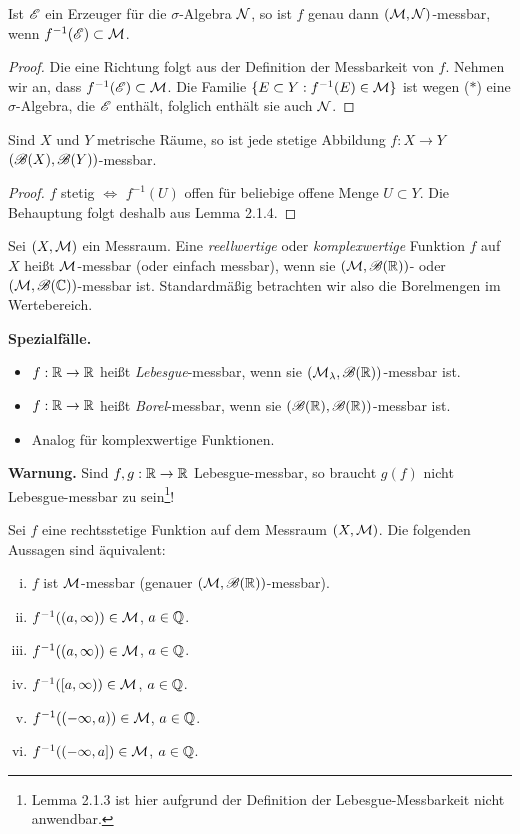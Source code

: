 \clearpage

\begin{lem}
 Ist $\mathscr{E}$ ein Erzeuger für die $\sigma$-Algebra $\mathcal{N}$, so ist $f$ genau dann $(\mathcal{M},\mathcal{N})$-messbar, wenn $f^{-1}(\mathscr{E}) \subset \mathcal{M}$.
\end{lem}

\begin{proof}
 Die eine Richtung folgt aus der Definition der Messbarkeit von $f$. Nehmen wir an, dass $f^{-1}(\mathscr{E}) \subset \mathcal{M}$. Die Familie $\{ E \subset Y : f^{-1}(E) \in \mathcal{M} \}$ ist wegen ($\ast$) eine $\sigma$-Algebra, die $\mathscr{E}$ enthält, folglich enthält sie auch $\mathcal{N}$.
\end{proof}

\begin{folg}
 Sind $X$ und $Y$ metrische Räume, so ist jede stetige Abbildung $f: X \to Y$ $(\mathscr{B}(X),\mathscr{B}(Y))$-messbar.
\end{folg}

\begin{proof}
 $f$ stetig $\Leftrightarrow$ $f^{-1}(U)$ offen für beliebige offene Menge $U \subset Y$. Die Behauptung folgt deshalb aus Lemma 2.1.4.
\end{proof}

Sei $(X,\mathcal{M})$ ein Messraum. Eine \emph{reellwertige} oder \emph{komplexwertige} Funktion $f$ auf $X$ heißt $\mathcal{M}$-messbar (oder einfach messbar), wenn sie $(\mathcal{M},\mathscr{B}(\mathbb{R}))$- oder $(\mathcal{M},\mathscr{B}(\mathbb{C}))$-messbar ist. Standardmäßig betrachten wir also die Borelmengen im Wertebereich.

\textbf{Spezialfälle.}
\begin{itemize}
 \item $f: \mathbb{R} \to \mathbb{R}$ heißt \emph{Lebesgue}-messbar, wenn sie $(\mathcal{M}_\lambda, \mathscr{B}(\mathbb{R}))$-messbar ist.
 \item $f: \mathbb{R} \to \mathbb{R}$ heißt \emph{Borel}-messbar, wenn sie $(\mathscr{B}(\mathbb{R}), \mathscr{B}(\mathbb{R}))$-messbar ist.
 \item Analog für komplexwertige Funktionen.
\end{itemize}

\textbf{Warnung.}
Sind $f,g: \mathbb{R} \to \mathbb{R}$ Lebesgue-messbar, so braucht $g(f)$ nicht Lebesgue-messbar zu sein\footnote{Lemma 2.1.3 ist hier aufgrund der Definition der Lebesgue-Messbarkeit nicht anwendbar.}!

\begin{lem}
 Sei $f$ eine rechtsstetige Funktion auf dem Messraum $(X,\mathcal{M})$. Die folgenden Aussagen sind äquivalent:
 \begin{enumerate}[(i)]
  \item $f$ ist $\mathcal{M}$-messbar (genauer $(\mathcal{M},\mathscr{B}(\mathbb{R}))$-messbar).
  \item $f^{-1}((a,\infty)) \in \mathcal{M}$, $a \in \mathbb{Q}$.
  \item $f^{-1}((a,\infty)) \in \mathcal{M}$, $a \in \mathbb{Q}$.
  \item $f^{-1}([a,\infty)) \in \mathcal{M}$, $a \in \mathbb{Q}$.
  \item $f^{-1}((-\infty,a)) \in \mathcal{M}$, $a \in \mathbb{Q}$.
  \item $f^{-1}((-\infty,a]) \in \mathcal{M}$, $a \in \mathbb{Q}$.
 \end{enumerate}
\end{lem}

